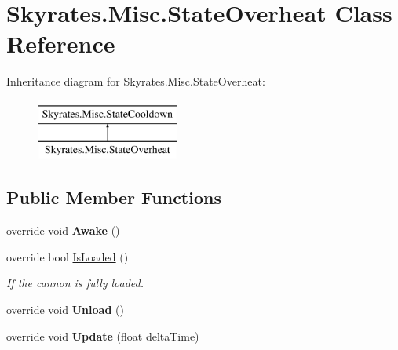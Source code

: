\hypertarget{class_skyrates_1_1_misc_1_1_state_overheat}{\section{Skyrates.\-Misc.\-State\-Overheat Class Reference}
\label{class_skyrates_1_1_misc_1_1_state_overheat}
}
Inheritance diagram for Skyrates.\-Misc.\-State\-Overheat\-:\begin{figure}[H]
\begin{center}
\leavevmode
\includegraphics[height=2.000000cm]{class_skyrates_1_1_misc_1_1_state_overheat}
\end{center}
\end{figure}
\subsection*{Public Member Functions}
\begin{DoxyCompactItemize}
\item 
\hypertarget{class_skyrates_1_1_misc_1_1_state_overheat_a0970cf98769341314c8c00c32140012a}{override void {\bfseries Awake} ()}\label{class_skyrates_1_1_misc_1_1_state_overheat_a0970cf98769341314c8c00c32140012a}

\item 
override bool \hyperlink{class_skyrates_1_1_misc_1_1_state_overheat_a14fddc721c07b8fa2530abaaba7fe15c}{Is\-Loaded} ()
\begin{DoxyCompactList}\small\item\em If the cannon is fully loaded. \end{DoxyCompactList}\item 
\hypertarget{class_skyrates_1_1_misc_1_1_state_overheat_a431bcfe7ccd3b22b460b17bc6bf44f11}{override void {\bfseries Unload} ()}\label{class_skyrates_1_1_misc_1_1_state_overheat_a431bcfe7ccd3b22b460b17bc6bf44f11}

\item 
\hypertarget{class_skyrates_1_1_misc_1_1_state_overheat_a91d1a6ee42292f2a17e7d53483cd40f4}{override void {\bfseries Update} (float delta\-Time)}\label{class_skyrates_1_1_misc_1_1_state_overheat_a91d1a6ee42292f2a17e7d53483cd40f4}

\end{DoxyCompactItemize}
